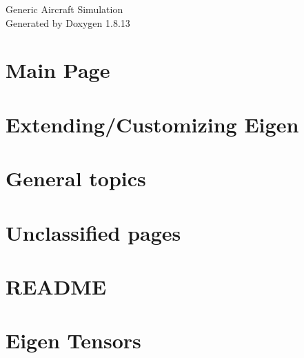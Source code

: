 \documentclass[twoside]{book}
\newcommand{\+}{\discretionary{\mbox{\scriptsize$\hookleftarrow$}}{}{}}
\newcommand{\clearemptydoublepage}{%
  \newpage{\pagestyle{empty}\cleardoublepage}%
}
\begin{document}
\hypersetup{pageanchor=false,
             bookmarksnumbered=true,
             pdfencoding=unicode
            }
\begin{titlepage}
\vspace*{7cm}
\begin{center}%
{\Large Generic Aircraft Simulation }\\
\vspace*{1cm}
{\large Generated by Doxygen 1.8.13}\\
\end{center}
\end{titlepage}
\clearemptydoublepage
{}
\tableofcontents
\clearemptydoublepage
{}
\hypersetup{pageanchor=true}

\chapter{Main Page}
\label{index}\hypertarget{index}{}
\chapter{Extending/\+Customizing Eigen}
\label{_user_manual__customizing_eigen}

\chapter{General topics}
\label{_user_manual__generalities}

\chapter{Unclassified pages}
\label{_unclassified_pages}

\chapter{R\+E\+A\+D\+ME}
\label{md__c_1__users_janol__desktop__generic_aircraft_simulation_eigen__r_e_a_d_m_e}

\chapter{Eigen Tensors}
\label{md__c_1__users_janol__desktop__generic_aircraft_simulation_eigen_unsupported__eigen__c_x_x11_src__tensor__r_e_a_d_m_e}

\end{document}

